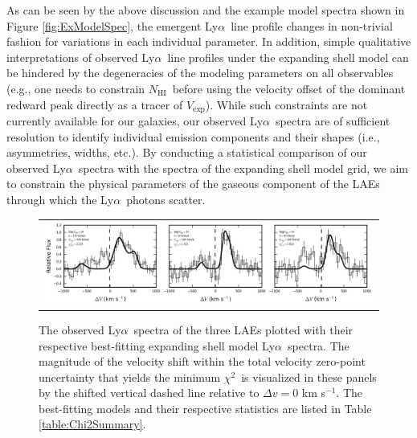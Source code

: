 \documentclass{emulateapj}
\newcommand{\lya}{Ly$\alpha$}
\def\nh{$N_{\mathrm{HI}}$}
\def\vexp{$V_{\mathrm{exp}}$}
\def\chisq{$\chi^{2}$}
\begin{document}
As can be seen by the above discussion and the example model spectra shown in Figure \ref{fig:ExModelSpec}, the emergent \lya\ line profile changes in non-trivial fashion for variations in each individual parameter. In addition, simple qualitative interpretations of observed \lya\ line profiles under the expanding shell model can be hindered by the degeneracies of the modeling parameters on all observables (e.g., one needs to constrain \nh\ before using the velocity offset of the dominant redward peak directly as a tracer of \vexp). While such constraints are not currently available for our galaxies, our observed \lya\ spectra are of sufficient resolution to identify individual emission components and their shapes (i.e., asymmetries, widths, etc.). By conducting a statistical comparison of our observed \lya\ spectra with the spectra of the expanding shell model grid, we aim to constrain the physical parameters of the gaseous component of the LAEs through which the \lya\ photons scatter. 

	\begin{figure}[t]
	\begin{center}
	\begin{tabular}{c}
	\includegraphics[width=18cm]{f7.png}
	\end{tabular}
	\end{center}
	\caption[example] 
	{ \label{fig:ModelComparison} 
	The observed \lya\ spectra of the three LAEs plotted with their respective best-fitting expanding shell model \lya\ spectra. The magnitude of the velocity shift within the total velocity zero-point uncertainty that yields the minimum \chisq\ is visualized in these panels by the shifted vertical dashed line relative to $\Delta v = 0$ km s$^{-1}$. The best-fitting models and their respective statistics are listed in Table \ref{table:Chi2Summary}.} 
	\end{figure} 
\end{document}
